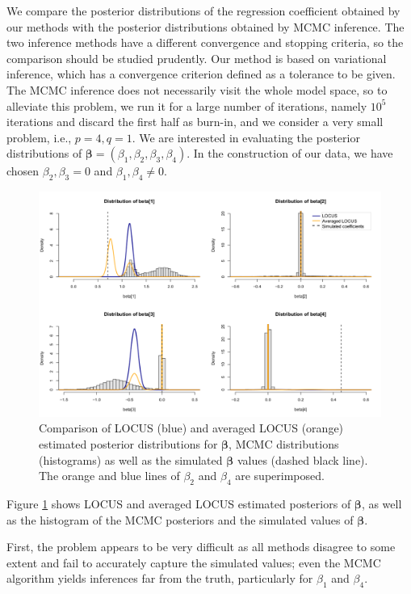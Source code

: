 \documentclass[a4paper, 11pt]{report}
\numberwithin{equation}{chapter}
\begin{document}
We compare the posterior distributions of the regression coefficient obtained by our methods with the posterior distributions obtained by MCMC inference. The two inference methods have a different convergence and stopping criteria, so the comparison should be studied prudently. Our method is based on variational inference, which has a convergence criterion defined as a tolerance to be given. The MCMC inference does not necessarily visit the whole model space, so to alleviate this problem, we run it for a large number of iterations, namely $10^5$ iterations and discard the first half as burn-in, and we consider a very small problem, i.e., $p=4, q=1$. We are interested in evaluating the posterior distributions of $\boldsymbol{\beta} = (\beta_1, \beta_2, \beta_3, \beta_4)$. In the construction of our data, we have chosen $\beta_2, \beta_3 = 0$ and $\beta_1, \beta_4 \neq 0$.
\begin{figure}[h]
\centering
\includegraphics[width=\textwidth, bb=0 0 800px 600px]{images/no_annealing.pdf}
\caption{\label{fig:no_ann}Comparison of LOCUS (blue) and averaged LOCUS (orange) estimated posterior distributions for $\boldsymbol{\beta}$, MCMC distributions (histograms) as well as the simulated $\boldsymbol{\beta}$ values (dashed black line). The orange and blue lines of $\beta_2$ and $\beta_4$ are superimposed.}
\end{figure}

Figure \ref{fig:no_ann} shows LOCUS and averaged LOCUS estimated posteriors of $\boldsymbol{\beta}$, as well as the histogram of the MCMC posteriors and the simulated values of $\boldsymbol{\beta}$. 

First, the problem appears to be very difficult as all methods disagree to some extent and fail to accurately capture the simulated values; even the MCMC algorithm yields inferences far from the truth, particularly for $\beta_1$ and $\beta_4$.
\end{document}
